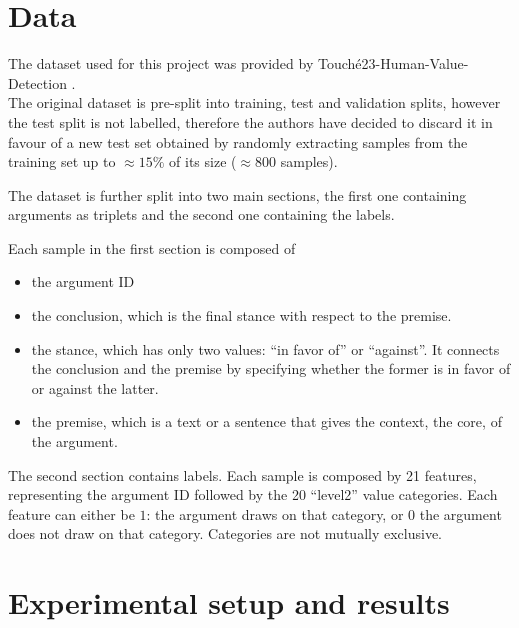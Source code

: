 \documentclass[11pt]{article}
\begin{document}
\section{Data}
\label{sec:data}
The dataset used for this project was provided by Touché23-Human-Value-Detection \cite{Kiesel2022}. \\
The original dataset is pre-split into training, test and validation splits, however the test split is not labelled, therefore the authors have decided to discard it in favour of a new test set obtained by randomly extracting samples from the training set up to $\approx 15\%$ of its size ($\approx 800$ samples).

The dataset is further split into two main sections, the first one containing arguments as triplets and the second one containing the labels.

Each sample in the first section is composed of

\begin{itemize}
\item the argument ID 
\item the conclusion, which is the final stance with respect to the premise.
\item the stance, which has only two values: ``in favor of'' or ``against''. It connects the conclusion and the premise by specifying whether the former is in favor of or against the latter.
\item the premise, which is a text or a sentence that gives the context, the core, of the argument.
\end{itemize}

The second section contains labels. Each sample is composed by 21 features, representing the argument ID followed by the 20 ``level2'' value categories. Each feature can either be $1$: the argument draws on that category, or $0$ the argument does not draw on that category. Categories are not mutually exclusive.


\section{Experimental setup and results}
\label{sec:results}
\end{document}
